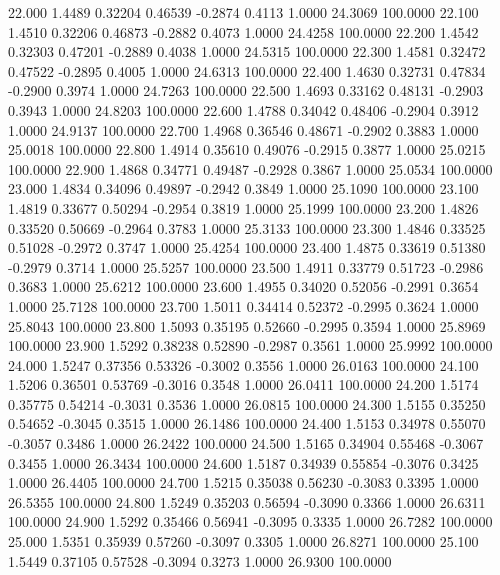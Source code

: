   22.000   1.4489   0.32204   0.46539  -0.2874   0.4113   1.0000  24.3069 100.0000
  22.100   1.4510   0.32206   0.46873  -0.2882   0.4073   1.0000  24.4258 100.0000
  22.200   1.4542   0.32303   0.47201  -0.2889   0.4038   1.0000  24.5315 100.0000
  22.300   1.4581   0.32472   0.47522  -0.2895   0.4005   1.0000  24.6313 100.0000
  22.400   1.4630   0.32731   0.47834  -0.2900   0.3974   1.0000  24.7263 100.0000
  22.500   1.4693   0.33162   0.48131  -0.2903   0.3943   1.0000  24.8203 100.0000
  22.600   1.4788   0.34042   0.48406  -0.2904   0.3912   1.0000  24.9137 100.0000
  22.700   1.4968   0.36546   0.48671  -0.2902   0.3883   1.0000  25.0018 100.0000
  22.800   1.4914   0.35610   0.49076  -0.2915   0.3877   1.0000  25.0215 100.0000
  22.900   1.4868   0.34771   0.49487  -0.2928   0.3867   1.0000  25.0534 100.0000
  23.000   1.4834   0.34096   0.49897  -0.2942   0.3849   1.0000  25.1090 100.0000
  23.100   1.4819   0.33677   0.50294  -0.2954   0.3819   1.0000  25.1999 100.0000
  23.200   1.4826   0.33520   0.50669  -0.2964   0.3783   1.0000  25.3133 100.0000
  23.300   1.4846   0.33525   0.51028  -0.2972   0.3747   1.0000  25.4254 100.0000
  23.400   1.4875   0.33619   0.51380  -0.2979   0.3714   1.0000  25.5257 100.0000
  23.500   1.4911   0.33779   0.51723  -0.2986   0.3683   1.0000  25.6212 100.0000
  23.600   1.4955   0.34020   0.52056  -0.2991   0.3654   1.0000  25.7128 100.0000
  23.700   1.5011   0.34414   0.52372  -0.2995   0.3624   1.0000  25.8043 100.0000
  23.800   1.5093   0.35195   0.52660  -0.2995   0.3594   1.0000  25.8969 100.0000
  23.900   1.5292   0.38238   0.52890  -0.2987   0.3561   1.0000  25.9992 100.0000
  24.000   1.5247   0.37356   0.53326  -0.3002   0.3556   1.0000  26.0163 100.0000
  24.100   1.5206   0.36501   0.53769  -0.3016   0.3548   1.0000  26.0411 100.0000
  24.200   1.5174   0.35775   0.54214  -0.3031   0.3536   1.0000  26.0815 100.0000
  24.300   1.5155   0.35250   0.54652  -0.3045   0.3515   1.0000  26.1486 100.0000
  24.400   1.5153   0.34978   0.55070  -0.3057   0.3486   1.0000  26.2422 100.0000
  24.500   1.5165   0.34904   0.55468  -0.3067   0.3455   1.0000  26.3434 100.0000
  24.600   1.5187   0.34939   0.55854  -0.3076   0.3425   1.0000  26.4405 100.0000
  24.700   1.5215   0.35038   0.56230  -0.3083   0.3395   1.0000  26.5355 100.0000
  24.800   1.5249   0.35203   0.56594  -0.3090   0.3366   1.0000  26.6311 100.0000
  24.900   1.5292   0.35466   0.56941  -0.3095   0.3335   1.0000  26.7282 100.0000
  25.000   1.5351   0.35939   0.57260  -0.3097   0.3305   1.0000  26.8271 100.0000
  25.100   1.5449   0.37105   0.57528  -0.3094   0.3273   1.0000  26.9300 100.0000
